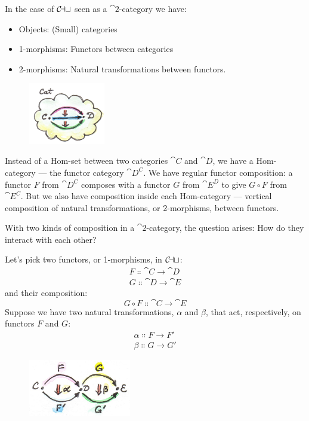 In the case of $\mathcal{C\mkern-3mu at}$ seen as a $\cat{2}$-category we have:

\begin{itemize}
\tightlist
\item
  Objects: (Small) categories
\item
  1-morphisms: Functors between categories
\item
  2-morphisms: Natural transformations between functors.
\end{itemize}

\begin{figure}[H]
\centering
\includegraphics[width=0.3\textwidth]{images/8_cat-2-cat.jpg}
\end{figure}

\noindent
Instead of a Hom-set between two categories $\cat{C}$ and $\cat{D}$, we have a
Hom-category --- the functor category $\cat{D^C}$. We have
regular functor composition: a functor $F$ from $\cat{D^C}$
composes with a functor $G$ from $\cat{E^D}$ to give $G \circ F$ from
$\cat{E^C}$. But we also have composition inside each
Hom-category --- vertical composition of natural transformations, or
2-morphisms, between functors.

With two kinds of composition in a $\cat{2}$-category, the question arises: How
do they interact with each other?

Let's pick two functors, or 1-morphisms, in $\mathcal{C\mkern-3mu at}$:
\begin{gather*}
F \Colon \cat{C} \to \cat{D} \\
G \Colon \cat{D} \to \cat{E}
\end{gather*}
and their composition:
\[G \circ F \Colon \cat{C} \to \cat{E}\]
Suppose we have two natural transformations, $\alpha$ and $\beta$, that act,
respectively, on functors $F$ and $G$:
\begin{gather*}
\alpha \Colon F \to F' \\
\beta \Colon G \to G'
\end{gather*}

\begin{figure}[H]
\centering
\includegraphics[width=0.4\textwidth]{images/10_horizontal.jpg}
\end{figure}

